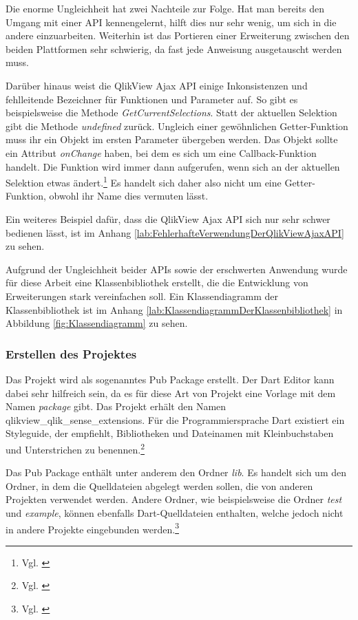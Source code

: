 Die enorme Ungleich\-heit hat zwei Nachteile zur Folge. Hat man bereits den Umgang mit einer API kennengelernt, hilft dies nur sehr wenig, um sich in die andere einzuarbeiten. Weiterhin ist das Portieren einer Erweiterung zwischen den beiden Plattformen sehr schwierig, da fast jede Anweisung ausgetauscht werden muss.

Darüber hinaus weist die QlikView Ajax API einige Inkonsistenzen und fehlleitende Bezeichner für Funktionen und Parameter auf. So gibt es beispielsweise die Methode \textit{GetCurrentSelections}. Statt der aktuellen Selektion gibt die Methode \textit{undefined} zurück. Ungleich einer gewöhnlichen Getter-Funktion muss ihr ein Objekt im ersten Parameter übergeben werden. Das Objekt sollte ein Attribut \textit{onChange} haben, bei dem es sich um eine Callback-Funktion handelt. Die Funktion wird immer dann aufgerufen, wenn sich an der aktuellen Selektion etwas ändert.\footnote{Vgl. \cite{JsDocReferenceGetCurrentSelections}} Es handelt sich daher also nicht um eine Getter-Funktion, obwohl ihr Name dies vermuten lässt. 

Ein weiteres Beispiel dafür, dass die QlikView Ajax API sich nur sehr schwer bedienen lässt, ist im Anhang \ref{lab:FehlerhafteVerwendungDerQlikViewAjaxAPI} zu sehen.

Aufgrund der Ungleich\-heit beider APIs sowie der erschwerten Anwendung wurde für diese Arbeit eine Klassen\-bibliothek erstellt, die die Entwicklung von Erweiterungen stark ver\-einfachen soll. Ein Klassendiagramm der Klassenbibliothek ist im Anhang \ref{lab:KlassendiagrammDerKlassenbibliothek} in Abbildung \ref{fig:Klassendiagramm} zu sehen.


\subsubsection{Erstellen des Projektes}

Das Projekt wird als sogenanntes Pub Package erstellt. Der Dart Editor kann dabei sehr hilfreich sein, da es für diese Art von Projekt eine Vorlage mit dem Namen \textit{package} gibt. Das Projekt erhält den Namen qlikview\_qlik\_sense\_extensions. Für die Programmiersprache Dart existiert ein Styleguide, der empfiehlt, Bibliotheken und Dateinamen mit Kleinbuchstaben und Unterstrichen zu benennen.\footnote{Vgl. \cite{DartStyleGuide}}


Das Pub Package enthält unter anderem den Ordner \textit{lib}. Es handelt sich um den Ordner, in dem die Quelldateien abgelegt werden sollen, die von anderen Projekten verwendet werden. Andere Ordner, wie beispielsweise die Ordner \textit{test} und \textit{example}, können ebenfalls Dart-Quelldateien enthalten, welche jedoch nicht in andere Projekte eingebunden werden.\footnote{Vgl. \cite{PubPackageLayoutConventions}}
 
